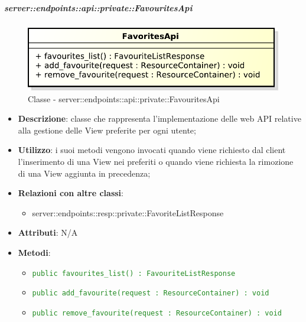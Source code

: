 
    \subparagraph{server::endpoints::api::private::FavouritesApi} %
    \label{subp:bdsm_app_server_endpoints_api_private_favoritesapi}
	\begin{figure}[!htbp]
		\centering
		\centerline{\includegraphics[scale=0.6]{./images/server/classes/endpoints/favorites_api.pdf}}
		\caption{Classe - server::endpoints::api::private::FavouritesApi}
	\end{figure}
    \begin{itemize}
      \item \textbf{Descrizione}: classe che rappresenta l'implementazione delle web API relative alla gestione delle View preferite per ogni utente;
      \item \textbf{Utilizzo}: i suoi metodi vengono invocati quando viene richiesto dal client l'inserimento di una View nei preferiti o quando viene richiesta la rimozione di una View aggiunta in precedenza;
      \item \textbf{Relazioni con altre classi}:
        \begin{itemize}
          \item server::endpoints::resp::private::FavoriteListResponse
        \end{itemize}
		\item \textbf{Attributi}: N/A
		\item \textbf{Metodi}:
			\begin{itemize}
				\item \textcolor{forestgreen}{\texttt{public favourites\_list() : FavouriteListResponse}}
				\item \textcolor{forestgreen}{\texttt{public add\_favourite(request : ResourceContainer) : void}}
				\item \textcolor{forestgreen}{\texttt{public remove\_favourite(request : ResourceContainer) : void}
        }
     	 \end{itemize}
      \end{itemize}
